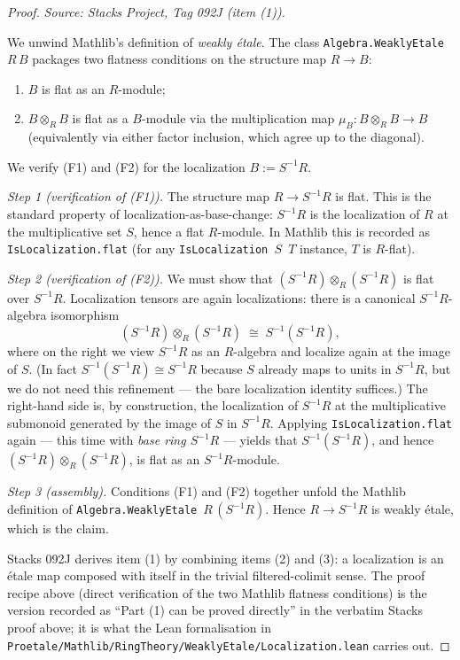 \begin{proof}
  \leanok
  \textit{Source: Stacks Project, Tag 092J (item (1)).}

  We unwind Mathlib's definition of \emph{weakly étale}. The class
  \texttt{Algebra.WeaklyEtale}~$R\,B$ packages two flatness conditions
  on the structure map $R \to B$:
  \begin{enumerate}
    \item[(F1)] $B$ is flat as an $R$-module;
    \item[(F2)] $B \otimes_R B$ is flat as a $B$-module via the
      multiplication map $\mu_B : B \otimes_R B \to B$ (equivalently
      via either factor inclusion, which agree up to the diagonal).
  \end{enumerate}
  We verify (F1) and (F2) for the localization $B := S^{-1} R$.

  \emph{Step 1 (verification of (F1)).} The structure map
  $R \to S^{-1} R$ is flat. This is the standard property of
  localization-as-base-change: $S^{-1} R$ is the localization of $R$ at
  the multiplicative set $S$, hence a flat $R$-module. In Mathlib this
  is recorded as \texttt{IsLocalization.flat} (for any
  \texttt{IsLocalization $S$ $T$} instance, $T$ is $R$-flat).

  \emph{Step 2 (verification of (F2)).} We must show that
  $(S^{-1} R) \otimes_R (S^{-1} R)$ is flat over $S^{-1} R$. Localization
  tensors are again localizations: there is a canonical $S^{-1} R$-algebra
  isomorphism
  \[
    (S^{-1} R) \otimes_R (S^{-1} R) \;\cong\; S^{-1}(S^{-1} R),
  \]
  where on the right we view $S^{-1} R$ as an $R$-algebra and localize
  again at the image of $S$. (In fact $S^{-1}(S^{-1} R) \cong S^{-1} R$
  because $S$ already maps to units in $S^{-1} R$, but we do not need this
  refinement — the bare localization identity suffices.) The right-hand
  side is, by construction, the localization of $S^{-1} R$ at the
  multiplicative submonoid generated by the image of $S$ in $S^{-1} R$.
  Applying \texttt{IsLocalization.flat} again — this time with
  \emph{base ring $S^{-1} R$} — yields that
  $S^{-1}(S^{-1} R)$, and hence $(S^{-1} R) \otimes_R (S^{-1} R)$, is
  flat as an $S^{-1} R$-module.

  \emph{Step 3 (assembly).} Conditions (F1) and (F2) together unfold
  the Mathlib definition of \texttt{Algebra.WeaklyEtale}~$R\,(S^{-1} R)$.
  Hence $R \to S^{-1} R$ is weakly étale, which is the claim.

  Stacks 092J derives item (1) by combining items (2) and (3): a
  localization is an étale map composed with itself in the trivial
  filtered-colimit sense. The proof recipe above (direct verification
  of the two Mathlib flatness conditions) is the version recorded as
  ``Part (1) can be proved directly'' in the verbatim Stacks proof
  above; it is what the Lean formalisation in
  \texttt{Proetale/Mathlib/RingTheory/WeaklyEtale/Localization.lean}
  carries out.
\end{proof}

